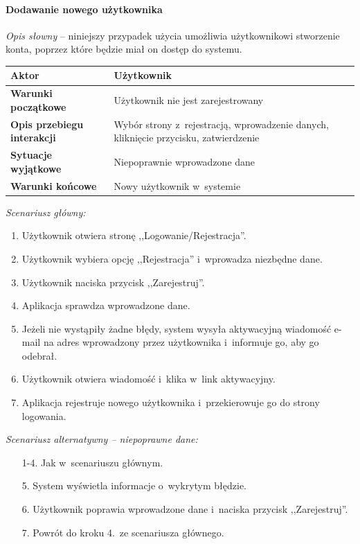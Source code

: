 \paragraph{Dodawanie nowego użytkownika\newline}
\label{par:register}

\textit{Opis słowny} -- niniejszy przypadek użycia umożliwia użytkownikowi stworzenie konta, poprzez które będzie miał
on dostęp do systemu.

\begin{longtable}{|p{5cm}|p{8cm}|}
  \hline \textbf{Aktor} & Użytkownik \\ \hline
  \textbf{Warunki początkowe} & Użytkownik nie jest zarejestrowany \\ \hline
  \textbf{Opis przebiegu interakcji} & Wybór strony z~rejestracją, wprowadzenie danych, kliknięcie przycisku,
  zatwierdzenie \\ \hline
  \textbf{Sytuacje wyjątkowe} & Niepoprawnie wprowadzone dane \\ \hline
  \textbf{Warunki końcowe} & Nowy użytkownik w~systemie \\ \hline
\end{longtable}

\noindent \textit{Scenariusz główny:}
\begin{enumerate}
  \item Użytkownik otwiera stronę ,,Logowanie/Rejestracja''.
  \item Użytkownik wybiera opcję ,,Rejestracja'' i~wprowadza niezbędne dane.
  \item Użytkownik naciska przycisk ,,Zarejestruj''.
  \item Aplikacja sprawdza wprowadzone dane.
  \item Jeżeli nie wystąpiły żadne błędy, system wysyła aktywacyjną wiadomość e-mail na adres wprowadzony przez użytkownika i~informuje go, aby go odebrał.
  \item Użytkownik otwiera wiadomość i~klika w~link aktywacyjny.
  \item Aplikacja rejestruje nowego użytkownika i~przekierowuje go do strony logowania.
\end{enumerate}

\noindent \textit{Scenariusz alternatywny -- niepoprawne dane:}
\begin{enumerate}
  \item[1-4.] Jak w~scenariuszu głównym.
  \item[5.] System wyświetla informacje o~wykrytym błędzie.
  \item[6.] Użytkownik poprawia wprowadzone dane i~naciska przycisk ,,Zarejestruj''.
  \item[7.] Powrót do kroku 4.~ze scenariusza głównego.
\end{enumerate}

